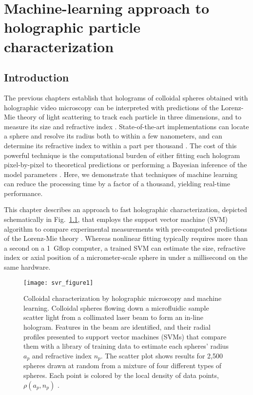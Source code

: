 \chapter{Machine-learning approach to holographic particle characterization}
\label{ch:svr}

\section{Introduction}

The previous chapters establish that holograms of colloidal spheres obtained 
with holographic video microscopy
\cite{sheng06,lee07}
can be interpreted with predictions of the Lorenz-Mie theory 
of light scattering \cite{bohren83}
to track each particle in three dimensions, and to measure 
its size and refractive index \cite{lee07a}.
State-of-the-art implementations \cite{lee07a,bourquard13,seifi13,fung13}
can locate a sphere and resolve its
radius both to within a few nanometers, and 
can determine its refractive index to within a part per thousand
\cite{cheong09,shpaisman12,krishnatreya14}.
The cost of this powerful technique is the computational burden of
either fitting each hologram pixel-by-pixel to theoretical predictions
\cite{lee07a,cheong10a} or performing a Bayesian inference of the
model parameters \cite{dimiduk16}.
Here, we demonstrate that techniques of machine learning
can reduce the processing time by a factor of a thousand,
yielding real-time performance.

This chapter describes an approach to fast holographic characterization,
depicted schematically in Fig.~\ref{fig:method}, that
employs the support vector machine (SVM) algorithm
\cite{smola04} 
to compare experimental measurements with
pre-computed predictions of the Lorenz-Mie theory
\cite{bohren83,lee07a,krishnatreya14a}.
Whereas nonlinear fitting typically requires more than a second
on a \SI{1}{\giga flop} computer,
a trained SVM can estimate the size, refractive index or
axial position of a micrometer-scale sphere
in under a millisecond on the same hardware.

\begin{figure}
  \centering
  \texttt{[image: svr\_figure1]}
  \caption{Colloidal characterization by holographic microscopy and
    machine learning.  Colloidal spheres flowing down a microfluidic
    sample scatter light from a collimated laser beam to form an
    in-line hologram.  Features in the beam are identified, and their
    radial profiles presented to support vector machines (SVMs)
    that compare them with a library of training data to estimate
    each spheres' radius $a_p$ and refractive index
    $n_p$.  The scatter plot shows results for 2,500 spheres
    drawn at random from a mixture of four different types of
    spheres.  Each point is colored by the local density of
    data points, $\rho(a_p,n_p)$ \cite{yevick14}.}
  \label{fig:method}
\end{figure}

